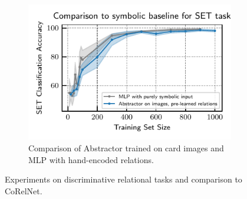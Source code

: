 \begin{figure}[t]
\begin{subfigure}[t]{0.32\textwidth}
    \end{subfigure}
    \begin{subfigure}[t]{0.32\textwidth}
        \centering\captionsetup{width=.9\linewidth}
        \vskip-20pt
        \includegraphics[width=\textwidth]{figures/experiments/set_symbolic_vs_abstractor.pdf}
        \vskip-5pt
        \caption{Comparison of Abstractor trained on card images and MLP with hand-encoded relations.}\label{fig:set_symbolic}%
    \end{subfigure}
    \caption{Experiments on discriminative relational tasks and comparison to CoRelNet.}
    \vskip-15pt
\end{figure}
